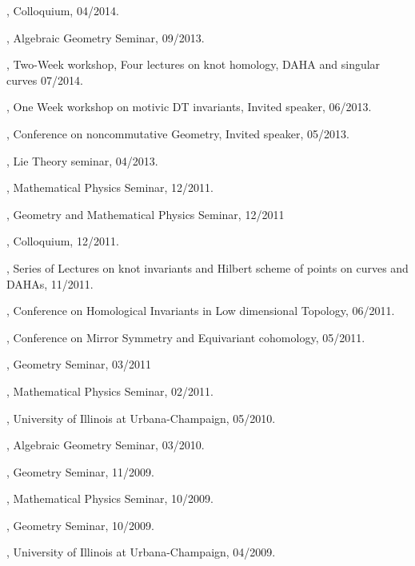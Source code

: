 \documentclass[11pt]{amsart}
\theoremstyle{plain}
\theoremstyle{definition}
\theoremstyle{remark}
\begin{document}
, Colloquium, 04/2014.

, Algebraic Geometry Seminar, 09/2013.

, Two-Week workshop, Four lectures on knot homology, DAHA and singular curves 07/2014.

, {One Week workshop on motivic DT invariants}, Invited speaker, 06/2013.

, {Conference on noncommutative Geometry}, Invited speaker, 05/2013.

, Lie Theory seminar, 04/2013.

, Mathematical Physics Seminar, 12/2011.

, Geometry and Mathematical Physics Seminar, 12/2011

, Colloquium, 12/2011.

, Series of Lectures on knot invariants and Hilbert scheme of points
on curves and DAHAs, 11/2011.

, Conference on Homological Invariants in Low dimensional 
Topology, 06/2011.

, Conference on Mirror Symmetry and Equivariant 
cohomology, 05/2011.

, Geometry Seminar, 03/2011

, Mathematical Physics Seminar, 02/2011.


,
University of Illinois at Urbana-Champaign,
05/2010.

, Algebraic Geometry Seminar,
03/2010.

, Geometry Seminar, 11/2009.

, Mathematical Physics Seminar,
10/2009.

, Geometry Seminar, 10/2009.

, University of Illinois at Urbana-Champaign,
04/2009.
\end{document}
